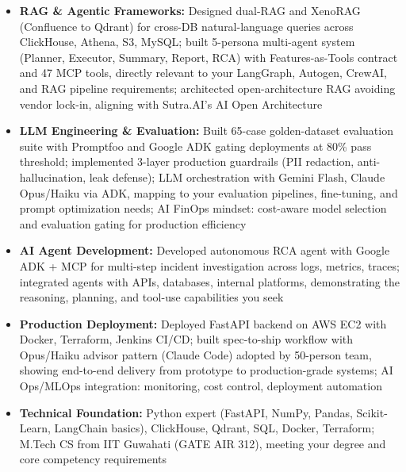 \documentclass[]{cover}
\begin{document}
{\raggedright{}\fontsize{11pt}{13pt}\selectfont
\begin{itemize}
    \item \textbf{RAG \& Agentic Frameworks:} Designed dual-RAG and XenoRAG (Confluence to Qdrant) for cross-DB natural-language queries across ClickHouse, Athena, S3, MySQL; built 5-persona multi-agent system (Planner, Executor, Summary, Report, RCA) with Features-as-Tools contract and 47 MCP tools, directly relevant to your LangGraph, Autogen, CrewAI, and RAG pipeline requirements; architected open-architecture RAG avoiding vendor lock-in, aligning with Sutra.AI's AI Open Architecture
    \item \textbf{LLM Engineering \& Evaluation:} Built 65-case golden-dataset evaluation suite with Promptfoo and Google ADK gating deployments at 80\% pass threshold; implemented 3-layer production guardrails (PII redaction, anti-hallucination, leak defense); LLM orchestration with Gemini Flash, Claude Opus/Haiku via ADK, mapping to your evaluation pipelines, fine-tuning, and prompt optimization needs; AI FinOps mindset: cost-aware model selection and evaluation gating for production efficiency
    \item \textbf{AI Agent Development:} Developed autonomous RCA agent with Google ADK + MCP for multi-step incident investigation across logs, metrics, traces; integrated agents with APIs, databases, internal platforms, demonstrating the reasoning, planning, and tool-use capabilities you seek
    \item \textbf{Production Deployment:} Deployed FastAPI backend on AWS EC2 with Docker, Terraform, Jenkins CI/CD; built spec-to-ship workflow with Opus/Haiku advisor pattern (Claude Code) adopted by 50-person team, showing end-to-end delivery from prototype to production-grade systems; AI Ops/MLOps integration: monitoring, cost control, deployment automation
    \item \textbf{Technical Foundation:} Python expert (FastAPI, NumPy, Pandas, Scikit-Learn, LangChain basics), ClickHouse, Qdrant, SQL, Docker, Terraform; M.Tech CS from IIT Guwahati (GATE AIR 312), meeting your degree and core competency requirements
\end{itemize}\par}
\vspace{6pt}

\end{document}

